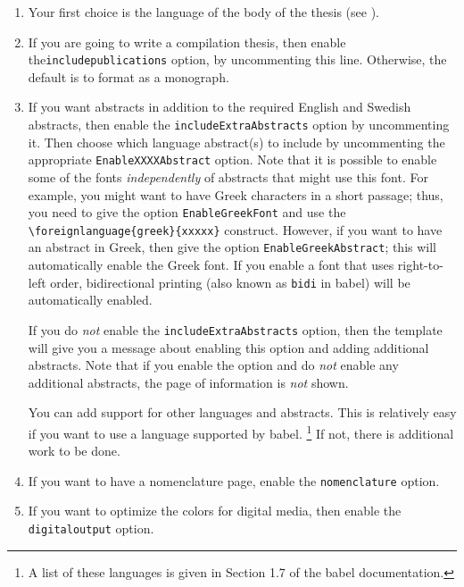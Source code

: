 \documentclass[12pt, twoside]{article}
\begin{document}
\begin{enumerate}
    \item 

Your first choice is the language of the body of the thesis (see ).

\item If you are going to write a compilation thesis, then enable the\linebreak[4] \texttt{includepublications} option, by uncommenting this line. Otherwise, the default is to format as a monograph.

\item If you want abstracts in addition to the required English and Swedish abstracts, then enable the \texttt{includeExtraAbstracts} option by uncommenting it. Then choose which language abstract(s) to include by uncommenting the appropriate \texttt{EnableXXXXAbstract} option. Note that it is possible to enable some of the fonts \textit{independently} of abstracts that might use this font. For example, you might want to have Greek characters in a short passage; thus, you need to give the option \texttt{EnableGreekFont} and use the \texttt{\textbackslash foreignlanguage\{greek\}\{xxxxx\}} construct. However, if you want to have an abstract in Greek, then give the option \texttt{EnableGreekAbstract}; this will automatically enable the Greek font. If you enable a font that uses right-to-left order, bidirectional printing (also known as \texttt{bidi} in babel) will be automatically enabled.

If you do \textit{not} enable the \texttt{includeExtraAbstracts} option, then the template will give you a message about enabling this option and adding additional abstracts. Note that if you enable the option and do \textit{not} enable any additional abstracts, the page of information is \textit{not} shown.

You can add support for other languages and abstracts. This is relatively easy if you want to use a language supported by babel. \footnote{A list of these languages is given in Section 1.7 of the babel documentation.} If not, there is additional work to be done.

\item If you want to have a nomenclature page, enable the \texttt{nomenclature} option.

\item If you want to optimize the colors for digital media, then enable the \texttt{digitaloutput} option.
\end{enumerate}
\end{document}
